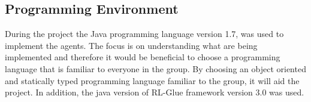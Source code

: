 \subsection{Programming Environment }
\label{sec:prog_env}
During the project the Java programming language version 1.7, was used to implement the agents. The focus is on understanding what are being implemented and therefore it would be beneficial to choose a programming language that is familiar to everyone in the group. By choosing an object oriented and statically typed programming language familiar to the group, it will aid the project. In addition, the java version of RL-Glue framework version 3.0 was used.
